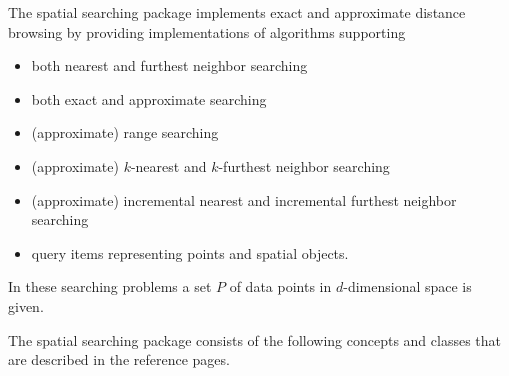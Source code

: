 
The spatial searching package implements
exact and approximate distance browsing
by providing implementations of algorithms supporting

\begin{itemize} 

\item
both nearest and furthest neighbor searching

\item
both exact and approximate searching

\item
(approximate) range searching

\item 
(approximate) $k$-nearest and $k$-furthest neighbor searching

\item 
(approximate) incremental nearest and incremental furthest neighbor searching

\item
query items representing points and spatial objects.

\end{itemize}

In these searching problems a set $P$ of data points in $d$-dimensional
space is given.

The spatial searching package 
consists of the following concepts and classes
that are described in the reference pages.



 \\
 \\ 
 \\
 \\
 \\
 \\
 \\
 \\
 \\
 \\
 \\


